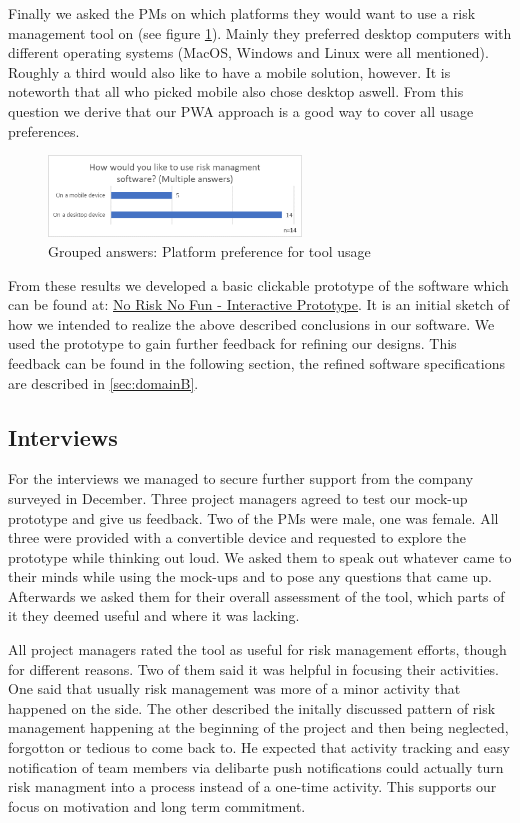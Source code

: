 Finally we asked the PMs on which platforms they would want to use a risk management tool on (see figure \ref{fig:label26}). Mainly they preferred desktop computers with different operating systems (MacOS, Windows and Linux were all mentioned). Roughly a third would also like to have a mobile solution, however. It is noteworth that all who picked mobile also chose desktop aswell. From this question we derive that our PWA approach is a good way to cover all usage preferences.

\begin{figure}[H]
	\centering
	\includegraphics[width=0.6\textwidth]{Assets/survey_results/Q7.png}
	\caption{Grouped answers: Platform preference for tool usage}
	\label{fig:label26}
\end{figure}

From these results we developed a basic clickable prototype of the software which can be found at: \underline{\href{https://norisknofun.invisionapp.com/prototype/NoRiskNoFunPreview-ck5aubx9g002w6o01rhyo61z3/play/40faaf12}{No Risk No Fun - Interactive Prototype}}. It is an initial sketch of how we intended to realize the above described conclusions in our software. We used the prototype to gain further feedback for refining our designs. This feedback can be found in the following section, the refined software specifications are described in \ref{sec:domainB}.

\subsection{Interviews}
\label{sec:DomainAb}
For the interviews we managed to secure further support from the company surveyed in December. Three project managers agreed to test our mock-up prototype and give us feedback. Two of the PMs were male, one was female. All three were provided with a convertible device and requested to explore the prototype while thinking out loud. We asked them to speak out whatever came to their minds while using the mock-ups and to pose any questions that came up. Afterwards we asked them for their overall assessment of the tool, which parts of it they deemed useful and where it was lacking.

All project managers rated the tool as useful for risk management efforts, though for different reasons. Two of them said it was helpful in focusing their activities. One said that usually risk management was more of a minor activity that happened on the side. The other described the initally discussed pattern of risk management happening at the beginning of the project and then being neglected, forgotton or tedious to come back to. He expected that activity tracking and easy notification of team members via delibarte push notifications could actually turn risk managment into a process instead of a one-time activity. This supports our focus on motivation and long term commitment.

